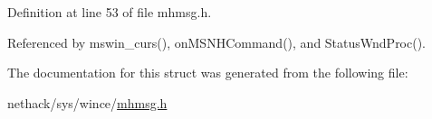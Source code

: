 Definition at line 53 of file mhmsg.\+h.



Referenced by mswin\+\_\+curs(), on\+M\+S\+N\+H\+Command(), and Status\+Wnd\+Proc().



The documentation for this struct was generated from the following file\+:\begin{DoxyCompactItemize}
\item 
nethack/sys/wince/\hyperlink{sys_2wince_2mhmsg_8h}{mhmsg.\+h}\end{DoxyCompactItemize}
